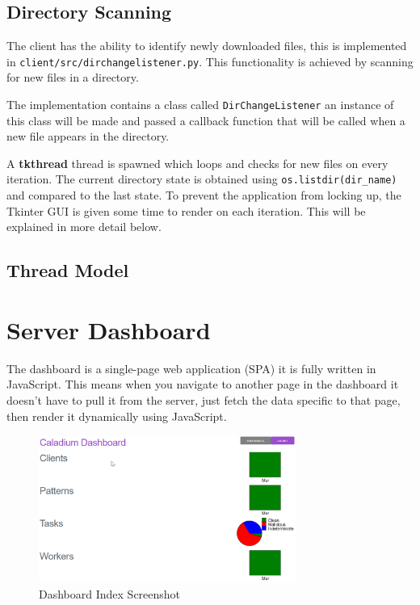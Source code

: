 \subsection{Directory Scanning}
The client has the ability to identify newly downloaded files,
this is implemented in \texttt{client/src/dirchangelistener.py}.
This functionality is achieved by scanning for new files in a directory.

The implementation contains a class called \texttt{DirChangeListener}
an instance of this class will be made and passed a callback function that
will be called when a new file appears in the directory.

A \textbf{tkthread} thread is spawned which loops
and checks for new files on every iteration.
The current directory state is obtained using
\texttt{os.listdir(dir\_name)} and compared to the last state.
To prevent the application from locking up,
the Tkinter GUI is given some time to render on each iteration.
This will be explained in more detail below.

\subsection{Thread Model}

\section{Server Dashboard}
The dashboard is a single-page web application (SPA) it is fully written in JavaScript.
This means when you navigate to another page in the dashboard it doesn't have to pull it from the server, just fetch the data specific to that page, then render it dynamically using JavaScript.

\begin{figure}[h!]
    \centering
    \includegraphics[width=0.75\textwidth]{../docs/dashboard.png}
    \caption{Dashboard Index Screenshot}
    \label{image:dashboardScreenshot}
\end{figure}

